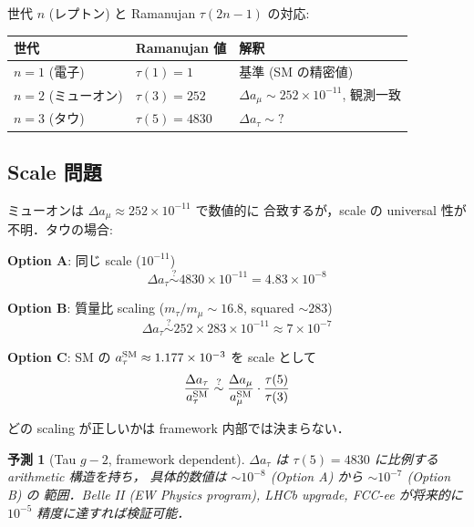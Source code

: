 \documentclass[11pt,a4paper]{article}
\newtheorem{prediction}{予測}
\begin{document}
世代 $n$ (レプトン) と Ramanujan $\tau(2n-1)$ の対応:

\begin{center}
\begin{tabular}{lll}
\toprule
世代 & Ramanujan 値 & 解釈 \\
\midrule
$n=1$ (電子) & $\tau(1) = 1$ & 基準 (SM の精密値) \\
$n=2$ (ミューオン) & $\tau(3) = 252$ & $\Delta a_\mu \sim 252\times 10^{-11}$, 観測一致 \\
$n=3$ (タウ) & $\tau(5) = 4830$ & $\Delta a_\tau \sim ?$\\
\bottomrule
\end{tabular}
\end{center}

\subsection{Scale 問題}

ミューオンは $\Delta a_\mu \approx 252 \times 10^{-11}$ で数値的に
合致するが，scale の universal 性が不明．タウの場合:

\textbf{Option A}: 同じ scale ($10^{-11}$)
\begin{equation}
\Delta a_\tau \stackrel{?}{\sim} 4830 \times 10^{-11} = 4.83 \times 10^{-8}
\end{equation}

\textbf{Option B}: 質量比 scaling ($m_\tau/m_\mu \sim 16.8$, squared $\sim 283$)
\begin{equation}
\Delta a_\tau \stackrel{?}{\sim} 252 \times 283 \times 10^{-11} \approx 7 \times 10^{-7}
\end{equation}

\textbf{Option C}: SM の $a_\tau^{\rm SM} \approx 1.177 \times 10^{-3}$ を
scale として
\begin{equation}
\frac{\Delta a_\tau}{a_\tau^{\rm SM}} \stackrel{?}{\sim} \frac{\Delta a_\mu}{a_\mu^{\rm SM}}\cdot\frac{\tau(5)}{\tau(3)}
\end{equation}

どの scaling が正しいかは framework 内部では決まらない．

\begin{prediction}[Tau $g-2$, framework dependent]
$\Delta a_\tau$ は $\tau(5) = 4830$ に比例する arithmetic 構造を持ち，
具体的数値は $\sim 10^{-8}$ (Option A) から $\sim 10^{-7}$ (Option B) の
範囲．Belle II (EW Physics program), LHCb upgrade, FCC-ee が将来的に
$10^{-5}$ 精度に達すれば検証可能．
\end{prediction}
\end{document}
